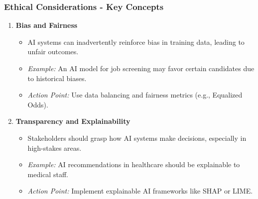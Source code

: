 \documentclass[aspectratio=169]{beamer}
\begin{document}
\begin{frame}[fragile]
    \frametitle{Ethical Considerations - Key Concepts}
    \begin{enumerate}
        \item \textbf{Bias and Fairness}
            \begin{itemize}
                \item AI systems can inadvertently reinforce bias in training data, leading to unfair outcomes.
                \item \textit{Example:} An AI model for job screening may favor certain candidates due to historical biases.
                \item \textit{Action Point:} Use data balancing and fairness metrics (e.g., Equalized Odds).
            \end{itemize}
        
        \item \textbf{Transparency and Explainability}
            \begin{itemize}
                \item Stakeholders should grasp how AI systems make decisions, especially in high-stakes areas.
                \item \textit{Example:} AI recommendations in healthcare should be explainable to medical staff.
                \item \textit{Action Point:} Implement explainable AI frameworks like SHAP or LIME.
            \end{itemize}
    \end{enumerate}
\end{frame}
\end{document}
